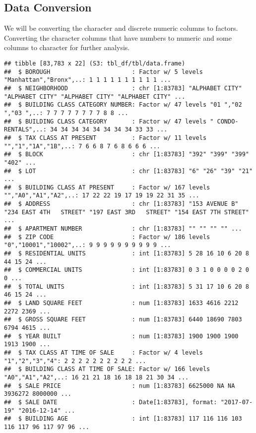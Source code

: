 \documentclass[
  a3paper,
]{article}
\begin{document}
\newpage

\hypertarget{data-conversion}{%
\subsection{\texorpdfstring{\textbf{Data
Conversion}}{Data Conversion}}\label{data-conversion}}

We will be converting the character and discrete numeric columns to
factors. Converting the character columns that have numbers to numeric
and some columns to character for further analysis.

\begin{verbatim}
## tibble [83,783 x 22] (S3: tbl_df/tbl/data.frame)
##  $ BOROUGH                       : Factor w/ 5 levels "Manhattan","Bronx",..: 1 1 1 1 1 1 1 1 1 1 ...
##  $ NEIGHBORHOOD                  : chr [1:83783] "ALPHABET CITY" "ALPHABET CITY" "ALPHABET CITY" "ALPHABET CITY" ...
##  $ BUILDING CLASS CATEGORY NUMBER: Factor w/ 47 levels "01 ","02 ","03 ",..: 7 7 7 7 7 7 7 7 8 8 ...
##  $ BUILDING CLASS CATEGORY       : Factor w/ 47 levels " CONDO-RENTALS",..: 34 34 34 34 34 34 34 34 33 33 ...
##  $ TAX CLASS AT PRESENT          : Factor w/ 11 levels "","1","1A","1B",..: 7 6 6 8 7 6 8 6 6 6 ...
##  $ BLOCK                         : chr [1:83783] "392" "399" "399" "402" ...
##  $ LOT                           : chr [1:83783] "6" "26" "39" "21" ...
##  $ BUILDING CLASS AT PRESENT     : Factor w/ 167 levels "","A0","A1","A2",..: 17 22 22 19 17 19 19 22 31 35 ...
##  $ ADDRESS                       : chr [1:83783] "153 AVENUE B" "234 EAST 4TH   STREET" "197 EAST 3RD   STREET" "154 EAST 7TH STREET" ...
##  $ APARTMENT NUMBER              : chr [1:83783] "" "" "" "" ...
##  $ ZIP CODE                      : Factor w/ 186 levels "0","10001","10002",..: 9 9 9 9 9 9 9 9 9 9 ...
##  $ RESIDENTIAL UNITS             : int [1:83783] 5 28 16 10 6 20 8 44 15 24 ...
##  $ COMMERCIAL UNITS              : int [1:83783] 0 3 1 0 0 0 0 2 0 0 ...
##  $ TOTAL UNITS                   : int [1:83783] 5 31 17 10 6 20 8 46 15 24 ...
##  $ LAND SQUARE FEET              : num [1:83783] 1633 4616 2212 2272 2369 ...
##  $ GROSS SQUARE FEET             : num [1:83783] 6440 18690 7803 6794 4615 ...
##  $ YEAR BUILT                    : num [1:83783] 1900 1900 1900 1913 1900 ...
##  $ TAX CLASS AT TIME OF SALE     : Factor w/ 4 levels "1","2","3","4": 2 2 2 2 2 2 2 2 2 2 ...
##  $ BUILDING CLASS AT TIME OF SALE: Factor w/ 166 levels "A0","A1","A2",..: 16 21 21 18 16 18 18 21 30 34 ...
##  $ SALE PRICE                    : num [1:83783] 6625000 NA NA 3936272 8000000 ...
##  $ SALE DATE                     : Date[1:83783], format: "2017-07-19" "2016-12-14" ...
##  $ BUILDING AGE                  : int [1:83783] 117 116 116 103 116 117 96 117 97 96 ...
\end{verbatim}
\end{document}

